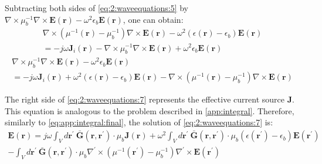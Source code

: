 		Subtracting both sides of \eqref{eq:2:waveequations:5} by $\nabla\times\mu_b^{-1}\nabla\times\mathbf{E}(\mathbf{r})-\omega^2\epsilon_b\mathbf{E}(\mathbf{r})$, one can obtain:
		\begin{multline}
			\nabla\times\left(\mu^{-1}(\mathbf{r})-\mu_b^{-1}\right)\nabla\times\mathbf{E}(\mathbf{r}) - \omega^2\left(\epsilon(\mathbf{r})-\epsilon_b\right)\mathbf{E}(\mathbf{r}) \\ =  -  j\omega\mathbf{J}_i(\mathbf{r}) -\nabla\times\mu_b^{-1}\nabla\times\mathbf{E}(\mathbf{r}) + \omega^2\epsilon_b\mathbf{E}(\mathbf{r}) \label{eq:2:waveequations:6}
		\end{multline}
		\begin{multline}
			\nabla\times\mu_b^{-1}\nabla\times\mathbf{E}(\mathbf{r}) - \omega^2\epsilon_b\mathbf{E}(\mathbf{r}) \\ = -j\omega\mathbf{J}_i(\mathbf{r}) + \omega^2\left(\epsilon(\mathbf{r})-\epsilon_b\right)\mathbf{E}(\mathbf{r}) -	\nabla\times\left(\mu^{-1}(\mathbf{r})-\mu_b^{-1}\right)\nabla\times\mathbf{E}(\mathbf{r}) \label{eq:2:waveequations:7} 
		\end{multline}
	
		The right side of \eqref{eq:2:waveequations:7} represents the effective current source $\mathbf{J}$. This equation is analogous to the problem described in \autoref{app:integral}. Therefore, similarly to \eqref{eq:app:integral:final}, the solution of \eqref{eq:2:waveequations:7} is:
		\begin{multline}
			\mathbf{E}(\mathbf{r}) =  j\omega \int_V d\mathbf{r^\prime}~ \mathbf{\bar{G}}(\mathbf{r},\mathbf{r^\prime})\cdot\mu_b\mathbf{J}(\mathbf{r}) + \omega^2\int_V d\mathbf{r^\prime}~\mathbf{\bar{G}}(\mathbf{r},\mathbf{r^\prime})\cdot\mu_b\left(\epsilon(\mathbf{r^\prime})-\epsilon_b\right)\mathbf{E}(\mathbf{r^\prime}) \\ - \int_V d\mathbf{r^\prime}~\mathbf{\bar{G}}(\mathbf{r},\mathbf{r^\prime})\cdot\mu_b\nabla^\prime\times\left(\mu^{-1}(\mathbf{r^\prime})-\mu_b^{-1}\right)\nabla^\prime\times\mathbf{E}(\mathbf{r^\prime}) \label{eq:2:waveequations:8}
		\end{multline}
	
